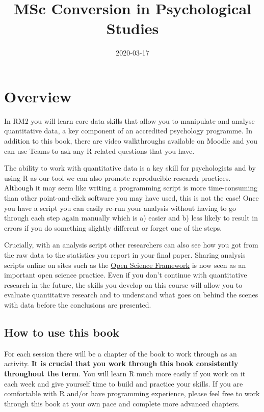 \documentclass[]{book}
\title{MSc Conversion in Psychological Studies}
\author{}
\date{\vspace{-2.5em}2020-03-17}
\begin{document}
\maketitle

{
\setcounter{tocdepth}{1}
\tableofcontents
}
\hypertarget{overview}{%
\chapter*{Overview}\label{overview}}

In RM2 you will learn core data skills that allow you to manipulate and analyse quantitative data, a key component of an accredited psychology programme. In addition to this book, there are video walkthroughs available on Moodle and you can use Teams to ask any R related questions that you have.

The ability to work with quantitative data is a key skill for psychologists and by using R as our tool we can also promote reproducible research practices. Although it may seem like writing a programming script is more time-consuming than other point-and-click software you may have used, this is not the case! Once you have a script you can easily re-run your analysis without having to go through each step again manually which is a) easier and b) less likely to result in errors if you do something slightly different or forget one of the steps.

Crucially, with an analysis script other researchers can also see how you got from the raw data to the statistics you report in your final paper. Sharing analysis scripts online on sites such as the \href{https://osf.io/}{Open Science Framework} is now seen as an important open science practice. Even if you don't continue with quantitative research in the future, the skills you develop on this course will allow you to evaluate quantitative research and to understand what goes on behind the scenes with data before the conclusions are presented.

\hypertarget{how-to-use-this-book}{%
\section{How to use this book}\label{how-to-use-this-book}}

For each session there will be a chapter of the book to work through as an activity. \textbf{It is crucial that you work through this book consistently throughout the term}. You will learn R much more easily if you work on it each week and give yourself time to build and practice your skills. If you are comfortable with R and/or have programming experience, please feel free to work through this book at your own pace and complete more advanced chapters.
\end{document}
